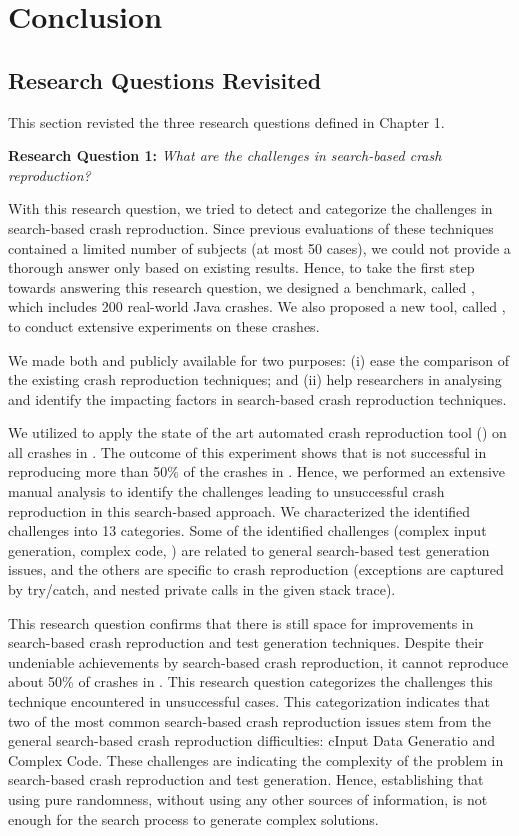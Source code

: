 \chapter{Conclusion}
\label{conclusion}

\section{Research Questions Revisited}

This section revisted the three research questions defined in Chapter 1.


\textbf{Research Question 1: }\textit{What are the challenges in search-based crash reproduction?}

With this research question, we tried to detect and categorize the challenges in search-based crash reproduction. Since previous evaluations of these techniques contained a limited number of subjects (at most 50 cases), we could not provide a thorough answer only based on existing results. Hence, to take the first step towards answering this research question, we designed a benchmark, called \crashpack, which includes 200 real-world Java crashes. We also proposed a new tool, called \exrunner, to conduct extensive experiments on these crashes.

We made both \crashpack and \exrunner publicly available for two purposes: 
(i) ease the comparison of the existing crash reproduction techniques; and 
(ii) help researchers in analysing and identify the impacting factors in search-based crash reproduction techniques.

We utilized \exrunner to apply the state of the art automated crash reproduction tool (\evocrash) on all crashes in \jcrashpack. The outcome of this experiment shows that \evocrash is not successful in reproducing more than 50\% of the crashes in \jcrashpack. Hence, we performed an extensive manual analysis to identify the challenges leading to unsuccessful crash reproduction in this search-based approach. We characterized the identified challenges into 13 categories. Some of the identified challenges (\eg complex input generation, complex code, \etc) are related to general search-based test generation issues, and the others are specific to crash reproduction (\eg exceptions are captured by try/catch, and nested private calls in the given stack trace).


This research question confirms that there is still space for improvements in search-based crash reproduction and test generation techniques. Despite their undeniable achievements by search-based crash reproduction, it cannot reproduce about 50\% of crashes in \crashpack. 
This research question categorizes the challenges this technique encountered in unsuccessful cases. This categorization indicates that two of the most common search-based crash reproduction issues stem from the general search-based crash reproduction difficulties: cInput Data Generatio and Complex Code. These challenges are indicating the complexity of the problem in search-based crash reproduction and test generation. Hence, establishing that using pure randomness, without using any other sources of information, is not enough for the search process to generate complex solutions.


